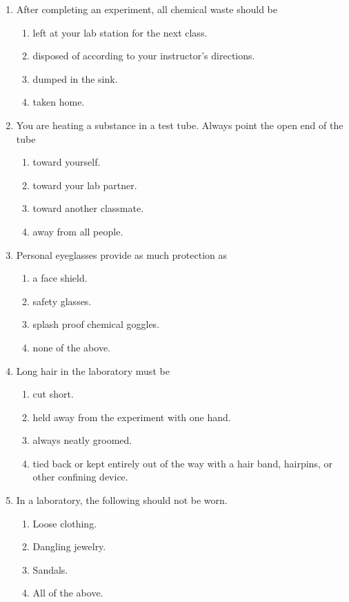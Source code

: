 \documentclass[cover.tex]{subfiles}
\begin{document}
\begin{refsection}
\begin{multicols*}{2}
\begin{enumerate}
\item After completing an experiment, all chemical waste should be
\begin{enumerate}[label=(\alph*)]
\item left at your lab station for the next class.
\item disposed of according to your instructor's directions.
\item dumped in the sink.
\item taken home.
\end{enumerate}

\item You are heating a substance in a test tube. Always point the open end of the tube
\begin{enumerate}[label=(\alph*)]
\item toward yourself.
\item toward your lab partner.
\item toward another classmate.
\item away from all people.
\end{enumerate}

\item Personal eyeglasses provide as much protection as
\begin{enumerate}[label=(\alph*)]
\item  a face shield.
\item  safety glasses.
\item  splash proof chemical goggles.
\item  none of the above.
\end{enumerate}

\item Long hair in the laboratory must be
\begin{enumerate}[label=(\alph*)]
\item cut short.
\item held away from the experiment with one hand.
\item always neatly groomed.
\item tied back or kept entirely out of the way with a hair band, hairpins, or other confining device.
\end{enumerate}

\item In a laboratory, the following should not be worn.
\begin{enumerate}[label=(\alph*)]
\item Loose clothing.
\item Dangling jewelry.
\item Sandals.
\item All of the above.
\end{enumerate}



\end{enumerate}
\end{multicols*}
\end{refsection}
\end{document}

